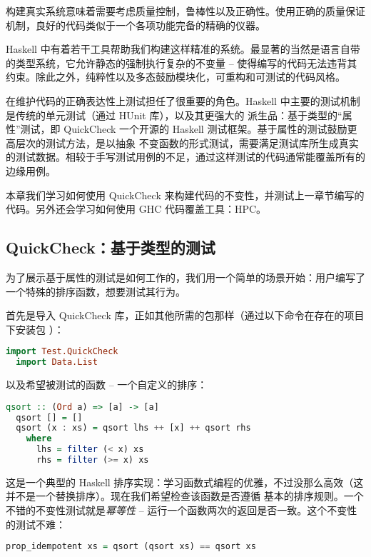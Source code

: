 \documentclass[./main.tex]{subfiles}
\begin{document}
构建真实系统意味着需要考虑质量控制，鲁棒性以及正确性。使用正确的质量保证机制，良好的代码类似于一个各项功能完备的精确的仪器。

Haskell 中有着若干工具帮助我们构建这样精准的系统。最显著的当然是语言自带的类型系统，它允许静态的强制执行复杂的不变量 --
使得编写的代码无法违背其约束。除此之外，纯粹性以及多态鼓励模块化，可重构和可测试的代码风格。

在维护代码的正确表达性上测试担任了很重要的角色。Haskell 中主要的测试机制是传统的单元测试（通过 HUnit 库），以及其更强大的
派生品：基于类型的“属性”测试，即 QuickCheck 一个开源的 Haskell 测试框架。基于属性的测试鼓励更高层次的测试方法，是以抽象
不变函数的形式测试，需要满足测试库所生成真实的测试数据。相较于手写测试用例的不足，通过这样测试的代码通常能覆盖所有的边缘用例。

本章我们学习如何使用 QuickCheck 来构建代码的不变性，并测试上一章节编写的代码。另外还会学习如何使用 GHC 代码覆盖工具：HPC。

\subsection*{QuickCheck：基于类型的测试}

为了展示基于属性的测试是如何工作的，我们用一个简单的场景开始：用户编写了一个特殊的排序函数，想要测试其行为。

首先是导入 QuickCheck 库，正如其他所需的包那样（通过以下命令在存在的项目下安装包
）：

\begin{lstlisting}[language=Haskell]
  import Test.QuickCheck
  import Data.List
\end{lstlisting}

以及希望被测试的函数 -- 一个自定义的排序：

\begin{lstlisting}[language=Haskell]
  qsort :: (Ord a) => [a] -> [a]
  qsort [] = []
  qsort (x : xs) = qsort lhs ++ [x] ++ qsort rhs
    where
      lhs = filter (< x) xs
      rhs = filter (>= x) xs
\end{lstlisting}

这是一个典型的 Haskell 排序实现：学习函数式编程的优雅，不过没那么高效（这并不是一个替换排序）。现在我们希望检查该函数是否遵循
基本的排序规则。一个不错的不变性测试就是\textit{幂等性} -- 运行一个函数两次的返回是否一致。这个不变性的测试不难：

\begin{lstlisting}[language=Haskell]
  prop_idempotent xs = qsort (qsort xs) == qsort xs
\end{lstlisting}
\end{document}
